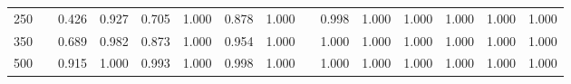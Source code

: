 % 
\begin{tabular}{ccccccccccccccc}
  \hline
  \hline
250 &  & 0.426 & 0.927 & 0.705 & 1.000 & 0.878 & 1.000 &  & 0.998 & 1.000 & 1.000 & 1.000 & 1.000 & 1.000 \\ 
  350 &  & 0.689 & 0.982 & 0.873 & 1.000 & 0.954 & 1.000 &  & 1.000 & 1.000 & 1.000 & 1.000 & 1.000 & 1.000 \\ 
  500 &  & 0.915 & 1.000 & 0.993 & 1.000 & 0.998 & 1.000 &  & 1.000 & 1.000 & 1.000 & 1.000 & 1.000 & 1.000 \\ 
   \hline
\end{tabular}
